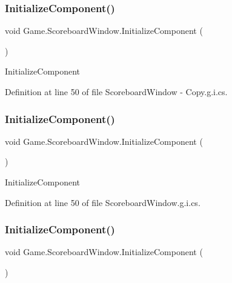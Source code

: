 \subsubsection{\texorpdfstring{InitializeComponent()}{InitializeComponent()}\hspace{0.1cm}{\footnotesize\ttfamily [1/3]}}
{\footnotesize\ttfamily void Game.\+Scoreboard\+Window.\+Initialize\+Component (\begin{DoxyParamCaption}{ }\end{DoxyParamCaption})}



Initialize\+Component 



Definition at line 50 of file Scoreboard\+Window -\/ Copy.\+g.\+i.\+cs.

\mbox{\label{class_game_1_1_scoreboard_window_a6579ede7390dda7349bb34ee46a917d7}} 
\subsubsection{\texorpdfstring{InitializeComponent()}{InitializeComponent()}\hspace{0.1cm}{\footnotesize\ttfamily [2/3]}}
{\footnotesize\ttfamily void Game.\+Scoreboard\+Window.\+Initialize\+Component (\begin{DoxyParamCaption}{ }\end{DoxyParamCaption})}



Initialize\+Component 



Definition at line 50 of file Scoreboard\+Window.\+g.\+i.\+cs.

\mbox{\label{class_game_1_1_scoreboard_window_a6579ede7390dda7349bb34ee46a917d7}} 
\subsubsection{\texorpdfstring{InitializeComponent()}{InitializeComponent()}\hspace{0.1cm}{\footnotesize\ttfamily [3/3]}}
{\footnotesize\ttfamily void Game.\+Scoreboard\+Window.\+Initialize\+Component (\begin{DoxyParamCaption}{ }\end{DoxyParamCaption})}



